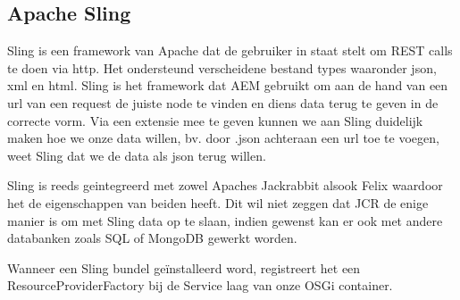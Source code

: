 \documentclass{article}
\begin{document}
	\subsection{Apache Sling}
	Sling is een framework van Apache dat de gebruiker in staat stelt om REST calls te doen via http. Het ondersteund verscheidene bestand types waaronder json, xml en html. Sling is het framework dat AEM gebruikt om aan de hand van een url van een request de juiste node te vinden en diens data terug te geven in de correcte vorm. Via een extensie mee te geven kunnen we aan Sling duidelijk maken hoe we onze data willen, bv. door .json achteraan een url toe te voegen, weet Sling dat we de data als json terug willen.
	\par
	Sling is reeds geintegreerd met zowel Apaches Jackrabbit alsook Felix waardoor het de eigenschappen van beiden heeft. Dit wil niet zeggen dat JCR de enige manier is om met Sling data op te slaan, indien gewenst kan er ook met andere databanken zoals SQL of MongoDB gewerkt worden. 
	\par
	 Wanneer een Sling bundel geïnstalleerd word, registreert het een ResourceProviderFactory bij de Service laag van onze OSGi container.  
\end{document}
